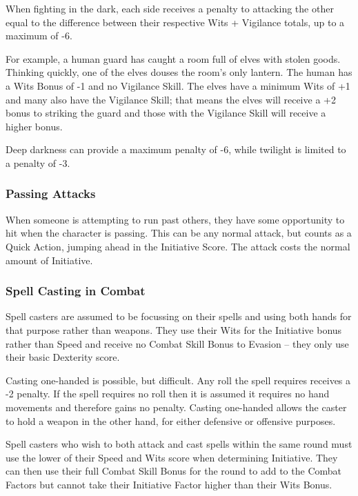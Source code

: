 \documentclass[titlepage,a4paper,openany]{book}
\begin{document}
\begin{multicols}{2}
When fighting in the dark, each side receives a penalty to attacking the other equal to the difference between their respective Wits + Vigilance totals, up to a maximum of -6.

For example, a human guard has caught a room full of elves with stolen goods. Thinking quickly, one of the elves douses the room's only lantern. The human has a Wits Bonus of -1 and no Vigilance Skill. The elves have a minimum Wits of +1 and many also have the Vigilance Skill; that means the elves will receive a +2 bonus to striking the guard and those with the Vigilance Skill will receive a higher bonus.

Deep darkness can provide a maximum penalty of -6, while twilight is limited to a penalty of -3.

\subsubsection{Passing Attacks}

When someone is attempting to run past others, they have some opportunity to hit when the character is passing. This can be any normal attack, but counts as a Quick Action, jumping ahead in the Initiative Score. The attack costs the normal amount of Initiative.

\subsubsection{Spell Casting in Combat}

Spell casters are assumed to be focussing on their spells and using both hands for that purpose rather than weapons. They use their Wits for the Initiative bonus rather than Speed and receive no Combat Skill Bonus to Evasion -- they only use their basic Dexterity score.

Casting one-handed is possible, but difficult. Any roll the spell requires receives a -2 penalty. If the spell requires no roll then it is assumed it requires no hand movements and therefore gains no penalty. Casting one-handed allows the caster to hold a weapon in the other hand, for either defensive or offensive purposes.

Spell casters who wish to both attack and cast spells within the same \gls{round} must use the lower of their Speed and Wits score when determining Initiative. They can then use their full Combat Skill Bonus for the \gls{round} to add to the Combat Factors but cannot take their Initiative Factor higher than their Wits Bonus.


\end{multicols}
\end{document}
